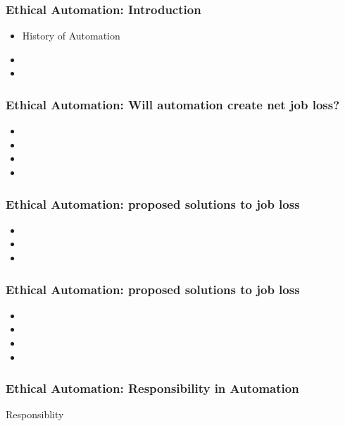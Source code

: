\begin{frame}
  \frametitle{ Ethical Automation: Introduction}
  \begin{itemize}
  \item History of Automation
  \item 
  \item
  \end{itemize}
\end{frame}
\begin{frame}
  \frametitle{ Ethical Automation: Will automation create net job loss?}
  \begin{itemize}
  \item
    
    
  \item 
    
  \item
    
  \item 
    
  \end{itemize}
\end{frame}
\begin{frame}
  \frametitle{ Ethical Automation: proposed solutions to job loss}
  \begin{itemize}
  \item 
    
  \item
    
  \item 
    
  \end{itemize}
\end{frame}
\begin{frame}
  \frametitle{ Ethical Automation: proposed solutions to job loss}
  \begin{itemize}
  \item
    
    
  \item 
    
  \item
    
  \item 
    
  \end{itemize}
\end{frame}


\begin{frame}
  \frametitle{ Ethical Automation: Responsibility in Automation}
  \Large{Responsiblity}
\end{frame}


